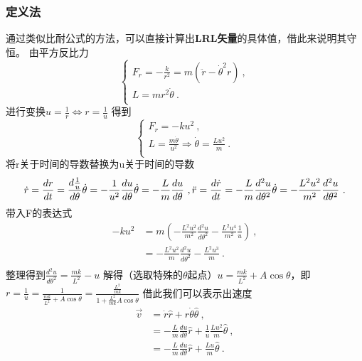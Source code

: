 \subsubsection{定义法}
通过类似比耐公式的方法，可以直接计算出\textbf{LRL矢量}的具体值，借此来说明其守恒。
由平方反比力
\begin{equation}
\begin{cases}
F_{r}=-\frac{k}{r^{2}} = m\left(\ddot r -\dot \theta ^{2}r\right)~, \\
L = mr^{2}\dot \theta ~.\\
\end{cases}
\end{equation}
进行变换$u = \frac{1}{r} \Longleftrightarrow r = \frac{1}{u}$
得到
\begin{equation}
\begin{cases}
F_{r}= -ku^{2} ~,\\
L = \frac{m\dot \theta}{u^{2}}\Rightarrow \dot \theta = \frac{Lu^2}{m} ~.\\
\end{cases}
\end{equation}
将r关于时间的导数替换为u关于时间的导数
\begin{equation}
\dot r = \frac{dr}{dt}= \frac{d \frac{1}{u}}{d\theta}\dot \theta =-\frac{1}{u^{2} } \frac{du}{d\theta} \dot \theta = -\frac{L}{m}\frac{du}{d\theta}~,\\
\ddot r = \frac{d \dot r}{d t} =-\frac{L}{m} \frac{d^{2}u}{d \theta^{2}} \dot \theta = -\frac{L^{2}u^{2}}{m^{2}}\frac{d^{2}u}{d \theta^{2}}~.\\
\end{equation}
带入F的表达式
\begin{align}
-ku^{2}
&=m\left(-\frac{L^{2}u^{2}}{m^{2}}\frac{d^{2}u}{d \theta^{2}}-\frac{L^{2}u^{4}}{m^{2}}\frac{1}{u}\right)~,\\
&= -\frac{L^{2}u^{2}}{m}\frac{d^{2}u}{d \theta^{2}}-\frac{L^{2}u^{3}}{m}~.\\
\end{align}
整理得到$\frac{d^{2}u}{d\theta^{2}} = \frac{mk}{L^{2}}-u$
解得（选取特殊的$\theta$起点）$u = \frac{mk}{L^{2}} + A \cos \theta$，即$r = \frac{1}{u} = \frac{1}{\frac{mk}{L^{2}} + A \cos \theta} = \frac{\frac{L^2}{mk}}{1 + \frac{L^2}{mk} A \cos \theta}$
借此我们可以表示出速度
\begin{align}
\vec v &= \dot r \hat r + r \dot \theta \hat \theta ~,\\
&=-\frac{L}{m}\frac{du}{d\theta} \hat r + \frac{1}{u} \frac{Lu^{2}}{m} \hat \theta ~,\\
&=-\frac{L}{m}\frac{du}{d\theta} \hat r +  \frac{Lu}{m} \hat \theta ~.\\
\end{align}

